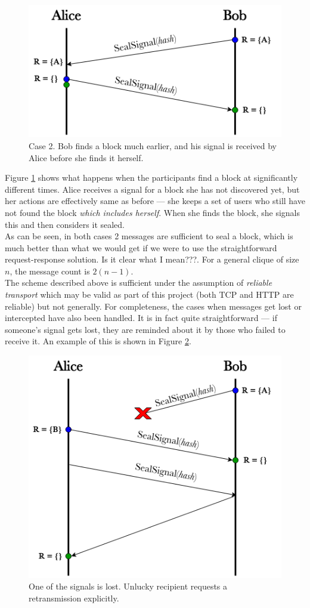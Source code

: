 \documentclass[a4paper, 12pt]{report}
\begin{document}
\begin{figure}[H]
    \captionsetup{width=0.76\textwidth}
    \centering
    \includegraphics[width=0.6\linewidth]{pics/sealing_lag.png}
    \caption{\label{fig:sealing_lag} Case 2. Bob finds a block much earlier, and his signal is received by Alice before she finds it herself.}
\end{figure}

Figure \ref{fig:sealing_lag} shows what happens when the participants find a block at significantly different times. Alice receives a signal for a block she has not discovered yet, but her actions are effectively same as before --- she keeps a set of users who still have not found the block \emph{which includes herself}. When she finds the block, she signals this and then considers it sealed. \\


As can be seen, in both cases 2 messages are sufficient to seal a block, which is much better than what we would get if we were to use the straightforward request-response solution. {\color{red} Is it clear what I mean???}. For a general clique of size $n$, the message count is $2(n-1)$. \\

The scheme described above is sufficient under the assumption of \emph{reliable transport} which may be valid as part of this project (both TCP and HTTP are reliable) but not generally. For completeness, the cases when messages get lost or intercepted have also been handled. It is in fact quite straightforward --- if someone's signal gets lost, they are reminded about it by those who failed to receive it. An example of this is shown in Figure \ref{fig:sealing_lost}.

\begin{figure}[H]
    \captionsetup{width=0.76\textwidth}
    \centering
    \includegraphics[width=0.6\linewidth]{pics/sealing_lost.png}
    \caption{\label{fig:sealing_lost} One of the signals is lost. Unlucky recipient requests a retransmission explicitly.}
\end{figure}
\end{document}
